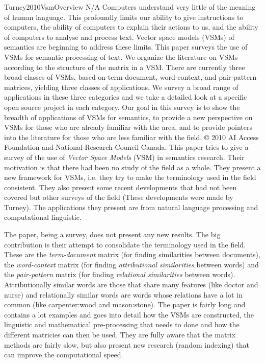 \documentclass[10pt]{article}
\begin{document}
\begin{review}
        {Turney2010VsmOverview}
        {N/A}
        {
            Computers understand very little of the meaning of human language. 
            This profoundly limits our ability to give instructions to computers, the ability of computers to explain their actions to us, and the ability of computers to analyse and process text. 
            Vector space models (VSMs) of semantics are beginning to address these limits. 
            This paper surveys the use of VSMs for semantic processing of text. 
            We organize the literature on VSMs according to the structure of the matrix in a VSM. 
            There are currently three broad classes of VSMs, based on term-document, word-context, and pair-pattern matrices, yielding three classes of applications. 
            We survey a broad range of applications in these three categories and we take a detailed look at a specific open source project in each category. 
            Our goal in this survey is to show the breadth of applications of VSMs for semantics, to provide a new perspective on VSMs for those who are already familiar with the area, and to provide pointers into the literature for those who are less familiar with the field. 
            © 2010 AI Access Foundation and National Research Council Canada.
        }
    This paper tries to give a survey of the use of \emph{Vector Space Models} (VSM) in semantics research.
    Their motivation is that there had been no study of the field as a whole.
    They present a new framework for VSMs, i.e. they try to make the terminology used in the field consistent.
    They also present some recent developments that had not been covered but other surveys of the field (These developments were made by Turney).
    The applications they present are from natural language processing and computational linguistic.
    
    The paper, being a survey, does not present any new results.
    The big contribution is their attempt to consolidate the terminology used in the field.
    These are the \emph{term-document} matrix (for finding similarities between documents), the \emph{word-context} matrix (for finding \emph{attributional similarities} between words) and the \emph{pair-pattern} matrix (for finding \emph{relational similarities} between words).
    Attributionally similar words are those that share many features (like doctor and nurse) and relationally similar words are words whose relations have a lot in common (like carpenter:wood and mason:stone).
    The paper is fairly long and contains a lot examples and goes into detail how the VSMs are constructed, the linguistic and mathematical pre-processing that needs to done and how the different matricies can then be used.
    They are fully aware that the matrix methods are fairly slow, but also present new research (random indexing) that can improve the computational speed.
    

\end{review}
\end{document}
